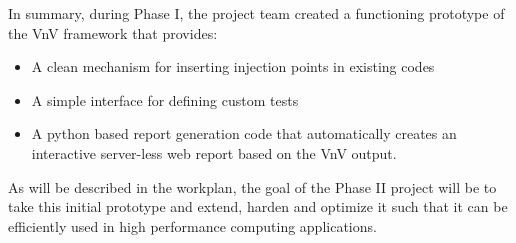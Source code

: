 In summary, during Phase I, the project team created a functioning prototype of the VnV framework that provides:
\begin{itemize}
 \item A clean mechanism for inserting injection points in existing codes
 \item A simple interface for defining custom tests 
 \item A python based report generation code that automatically creates an interactive server-less web report based on the VnV output.
\end{itemize}

As will be described in the workplan, the goal of the Phase II project will be to take this initial prototype and extend, harden and 
optimize it such that it can be efficiently used in high performance computing applications. 





























